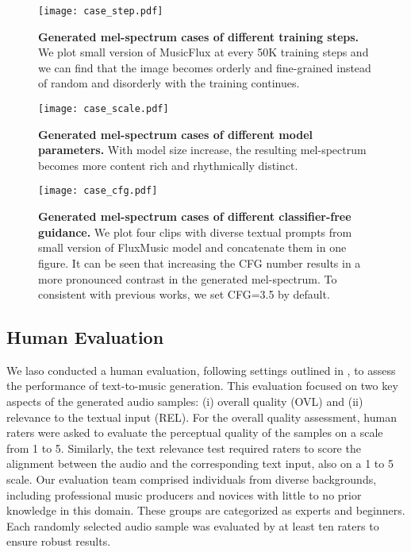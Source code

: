 \begin{figure*}[t]
  \centering
   \texttt{[image: case\_step.pdf]}
   \caption{\textbf{Generated mel-spectrum cases of different training steps. } We plot small version of MusicFlux at every 50K training steps and we can find that the image becomes orderly and fine-grained instead of random and disorderly with the training continues. 
   }
   \label{fig:step} 
\end{figure*}

\begin{figure*}[t]
  \centering
   \texttt{[image: case\_scale.pdf]}
   \caption{\textbf{Generated mel-spectrum cases of different model parameters. } With model size increase, the resulting mel-spectrum becomes more content rich and rhythmically distinct.
   }
   \label{fig:case_scale} 
\end{figure*}

\begin{figure*}[t]
  \centering
   \texttt{[image: case\_cfg.pdf]}
   \caption{\textbf{Generated mel-spectrum cases of different classifier-free guidance.} We plot four clips with diverse textual prompts from small version of FluxMusic model and concatenate them in one figure. It can be seen that increasing the CFG number results in a more pronounced contrast in the generated mel-spectrum. To consistent with previous works, we set CFG=3.5 by default. 
   }
   \label{fig:cfg} 
\end{figure*}

\subsection{Human Evaluation}
We laso conducted a human evaluation, following settings outlined in \cite{li2024quality,liu2024audioldm}, to assess the performance of text-to-music generation. This evaluation focused on two key aspects of the generated audio samples: (i) overall quality (OVL) and (ii) relevance to the textual input (REL).
For the overall quality assessment, human raters were asked to evaluate the perceptual quality of the samples on a scale from 1 to 5. Similarly, the text relevance test required raters to score the alignment between the audio and the corresponding text input, also on a 1 to 5 scale.
Our evaluation team comprised individuals from diverse backgrounds, including professional music producers and novices with little to no prior knowledge in this domain. These groups are categorized as experts and beginners. Each randomly selected audio sample was evaluated by at least ten raters to ensure robust results.


